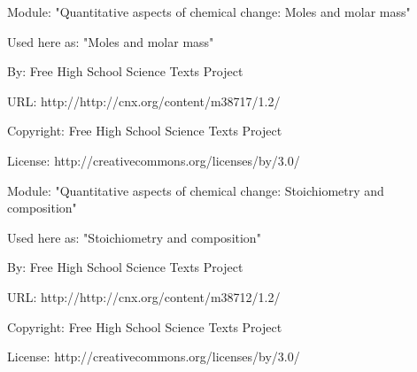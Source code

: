       \par\vspace{9pt}\noindent\begin{minipage}{\textwidth}
      Module: "Quantitative aspects of chemical change: Moles and molar mass" \par\nopagebreak\noindent
      Used here as: "Moles and molar mass" \par\nopagebreak\noindent
        By: Free High School Science Texts Project\par\nopagebreak\noindent
      URL: http://http://cnx.org/content/m38717/1.2/\par\nopagebreak\noindent
      \par\nopagebreak\noindent
      Copyright: Free High School Science Texts Project\par\nopagebreak\noindent
      License:  http://creativecommons.org/licenses/by/3.0/\par\nopagebreak\noindent
      \par\end{minipage}
      \par\vspace{9pt}\noindent\begin{minipage}{\textwidth}
      Module: "Quantitative aspects of chemical change: Stoichiometry and composition" \par\nopagebreak\noindent
      Used here as: "Stoichiometry and composition" \par\nopagebreak\noindent
        By: Free High School Science Texts Project\par\nopagebreak\noindent
      URL: http://http://cnx.org/content/m38712/1.2/\par\nopagebreak\noindent
      \par\nopagebreak\noindent
      Copyright: Free High School Science Texts Project\par\nopagebreak\noindent
      License:  http://creativecommons.org/licenses/by/3.0/\par\nopagebreak\noindent
      \par\end{minipage}
